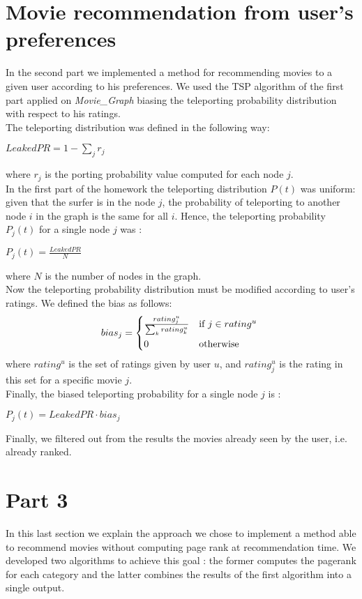 \documentclass[11pt]{article}
\begin{document}
\section{Movie recommendation from user's preferences}
In the second part we implemented a method for recommending movies to a given user according to his preferences.
We used the TSP algorithm of the first part applied on \textit{Movie\_Graph} biasing the teleporting probability
distribution with respect to his ratings.\\
The teleporting distribution was defined in the following way: \\
\begin{center}
  $LeakedPR = 1 - \sum_{j}{r_j}$
\end{center}
where $r_j$ is the porting probability value computed for each node $j$.\\
In the first part of the homework the teleporting distribution $P(t)$ was uniform:
given that the surfer is in the node $j$, the probability of teleporting to another node $i$ in the graph is the same
for all $i$. Hence, the teleporting probability $P_{j}(t)$ for a single node $j$ was :
\begin{center}
  $P_{j}(t) = \frac{LeakedPR}{N}$
\end{center}
where $N$ is the number of nodes in the graph.\\
Now the teleporting probability distribution must be modified according to user's ratings. We defined the bias as follows:
\begin{equation}
    bias_{j} =
    \begin{cases*}
      \frac{rating^{u}_{j}}{\sum_{k}{rating^{u}_{k}}} & if $j \in rating^{u}$ \\
      0        & otherwise
    \end{cases*}
  \end{equation}
where $rating^{u}$ is the set of ratings given by user $u$, and $rating^{u}_{j}$ is the rating in this set for a specific
movie $j$. \\
Finally, the biased teleporting probability for a single node $j$ is :
\begin{center}
  $P_{j}(t) = LeakedPR \cdot bias_{j}$
\end{center}
Finally, we filtered out from the results the movies already seen by the user, i.e. already ranked.

\section{Part 3}
In this last section we explain the approach we chose to implement a method able to recommend movies without computing
page rank at recommendation time. We developed two algorithms to achieve this goal : the former computes the pagerank
for each category and the latter combines the results of the first algorithm into a single output. \\
\end{document}
